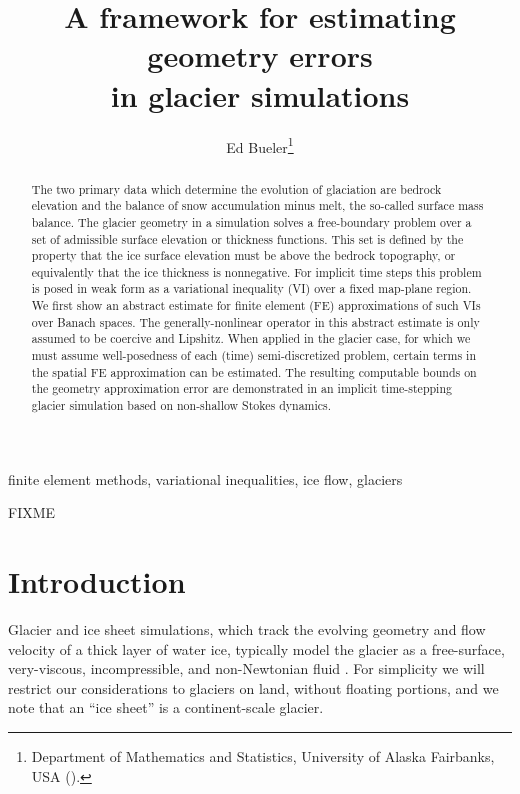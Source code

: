 \documentclass[hidelinks,onefignum,onetabnum,final]{siamart220329}  %
\title{A framework for estimating geometry errors \\ in glacier simulations}
\author{Ed Bueler\thanks{Department of Mathematics and Statistics, University of Alaska Fairbanks, USA (\email{elbueler@alaska.edu}).}}
\begin{document}
\maketitle

\begin{abstract}
The two primary data which determine the evolution of glaciation are bedrock elevation and the balance of snow accumulation minus melt, the so-called surface mass balance.  The glacier geometry in a simulation solves a free-boundary problem over a set of admissible surface elevation or thickness functions.  This set is defined by the property that the ice surface elevation must be above the bedrock topography, or equivalently that the ice thickness is nonnegative.  For implicit time steps this problem is posed in weak form as a variational inequality (VI) over a fixed map-plane region.  We first show an abstract estimate for finite element (FE) approximations of such VIs over Banach spaces.  The generally-nonlinear operator in this abstract estimate is only assumed to be coercive and Lipshitz.  When applied in the glacier case, for which we must assume well-posedness of each (time) semi-discretized problem, certain terms in the spatial FE approximation can be estimated.  The resulting computable bounds on the geometry approximation error are demonstrated in an implicit time-stepping glacier simulation based on non-shallow Stokes dynamics.
\end{abstract}

\begin{keywords}
finite element methods, variational inequalities, ice flow, glaciers
\end{keywords}

\begin{MSCcodes}
FIXME
\end{MSCcodes}


\section{Introduction} \label{sec:intro}

Glacier and ice sheet simulations, which track the evolving geometry and flow velocity of a thick layer of water ice, typically model the glacier as a free-surface, very-viscous, incompressible, and non-Newtonian fluid \cite{GreveBlatter2009,SchoofHewitt2013}.  For simplicity we will restrict our considerations to glaciers on land, without floating portions, and we note that an ``ice sheet'' is a continent-scale glacier.
\end{document}
